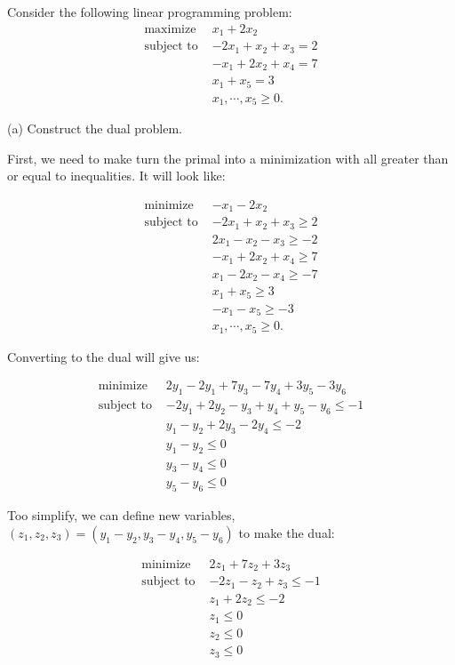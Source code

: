 \documentclass[12pt]{extarticle}
\theoremstyle{definition}
\begin{document}
\begin{problem} Consider the following linear programming problem:
	 \begin{align*}
	\text{maximize } &x_1+2x_2\\
	\text{subject to } & -2x_1+x_2+x_3=2\\
	&-x_1+2x_2+x_4=7\\
	&x_1+x_5=3\\
	&x_1,\cdots,x_5\geq 0.
	\end{align*}

	\begin{description}

		\item{(a)} Construct the dual problem.

		First, we need to make turn the primal into a minimization with all greater than or equal to inequalities. It will look like:

			 \begin{align*}
			\text{minimize } &-x_1-2x_2\\
			\text{subject to } & -2x_1+x_2+x_3\geq2\\
			&2x_1-x_2-x_3\geq-2\\
			&-x_1+2x_2+x_4\geq7\\
			&x_1-2x_2-x_4\geq-7\\
			&x_1+x_5\geq3\\
			&-x_1-x_5\geq-3\\
			&x_1,\cdots,x_5\geq 0.
			\end{align*}

		Converting to the dual will give us:

			\begin{align*}
			\text{minimize } &2y_1-2y_1+7y_3-7y_4+3y_5-3y_6\\
			\text{subject to } & -2y_1+2y_2-y_3+y_4+y_5-y_6\leq-1\\
			&y_1-y_2+2y_3-2y_4\leq-2\\
			&y_1-y_2 \leq 0\\
			&y_3-y_4 \leq 0\\
			&y_5-y_6 \leq 0
			\end{align*}

		Too simplify, we can define new variables, $(z_1,z_2,z_3)=(y_1-y_2,y_3-y_4,y_5-y_6)$ to make the dual:

			\begin{align*}
			\text{minimize } &2z_1+7z_2+3z_3\\
			\text{subject to } & -2z_1-z_2+z_3\leq-1\\
			&z_1+2z_2\leq-2\\
			&z_1 \leq 0\\
			&z_2 \leq 0\\
			&z_3 \leq 0
			\end{align*}


\end{description}
\end{problem}
\end{document}
